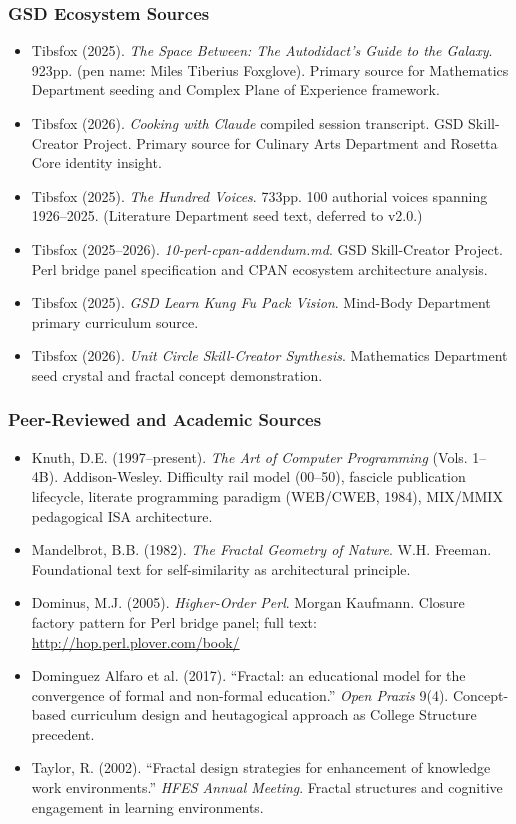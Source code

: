 \documentclass[11pt,letterpaper]{article}
\begin{document}
\subsubsection{GSD Ecosystem Sources}
\begin{itemize}[leftmargin=1.5em]
  \item Tibsfox (2025). \textit{The Space Between: The Autodidact's Guide to the Galaxy}. 923pp. (pen name: Miles Tiberius Foxglove). Primary source for Mathematics Department seeding and Complex Plane of Experience framework.
  \item Tibsfox (2026). \textit{Cooking with Claude} compiled session transcript. GSD Skill-Creator Project. Primary source for Culinary Arts Department and Rosetta Core identity insight.
  \item Tibsfox (2025). \textit{The Hundred Voices}. 733pp. 100 authorial voices spanning 1926--2025. (Literature Department seed text, deferred to v2.0.)
  \item Tibsfox (2025--2026). \textit{10-perl-cpan-addendum.md}. GSD Skill-Creator Project. Perl bridge panel specification and CPAN ecosystem architecture analysis.
  \item Tibsfox (2025). \textit{GSD Learn Kung Fu Pack Vision}. Mind-Body Department primary curriculum source.
  \item Tibsfox (2026). \textit{Unit Circle Skill-Creator Synthesis}. Mathematics Department seed crystal and fractal concept demonstration.
\end{itemize}

\subsubsection{Peer-Reviewed and Academic Sources}
\begin{itemize}[leftmargin=1.5em]
  \item Knuth, D.E. (1997--present). \textit{The Art of Computer Programming} (Vols. 1--4B). Addison-Wesley. Difficulty rail model (00--50), fascicle publication lifecycle, literate programming paradigm (WEB/CWEB, 1984), MIX/MMIX pedagogical ISA architecture.
  \item Mandelbrot, B.B. (1982). \textit{The Fractal Geometry of Nature}. W.H. Freeman. Foundational text for self-similarity as architectural principle.
  \item Dominus, M.J. (2005). \textit{Higher-Order Perl}. Morgan Kaufmann. Closure factory pattern for Perl bridge panel; full text: \url{http://hop.perl.plover.com/book/}
  \item Dominguez Alfaro et al. (2017). ``Fractal: an educational model for the convergence of formal and non-formal education.'' \textit{Open Praxis} 9(4). Concept-based curriculum design and heutagogical approach as College Structure precedent.
  \item Taylor, R. (2002). ``Fractal design strategies for enhancement of knowledge work environments.'' \textit{HFES Annual Meeting}. Fractal structures and cognitive engagement in learning environments.
\end{itemize}
\end{document}
